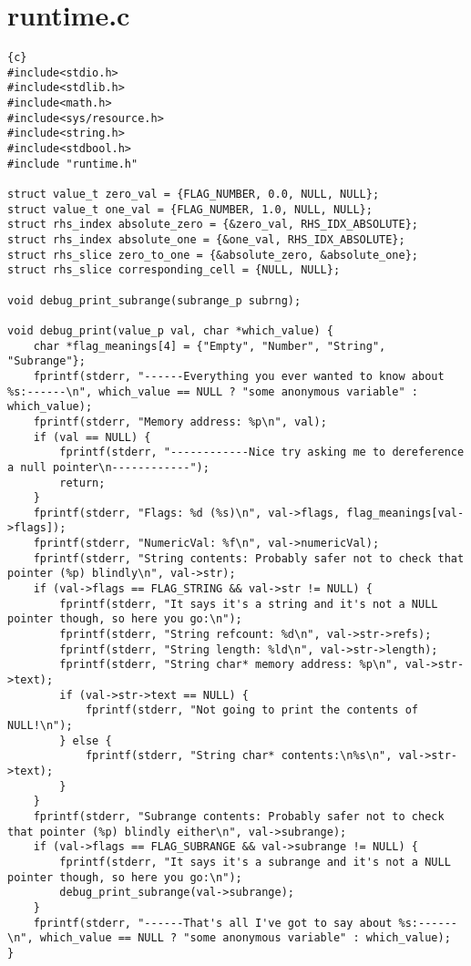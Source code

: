 \section{runtime.c}
\begin{lstlisting}{c}
#include<stdio.h>
#include<stdlib.h>
#include<math.h>
#include<sys/resource.h>
#include<string.h>
#include<stdbool.h>
#include "runtime.h"

struct value_t zero_val = {FLAG_NUMBER, 0.0, NULL, NULL};
struct value_t one_val = {FLAG_NUMBER, 1.0, NULL, NULL};
struct rhs_index absolute_zero = {&zero_val, RHS_IDX_ABSOLUTE};
struct rhs_index absolute_one = {&one_val, RHS_IDX_ABSOLUTE};
struct rhs_slice zero_to_one = {&absolute_zero, &absolute_one};
struct rhs_slice corresponding_cell = {NULL, NULL};

void debug_print_subrange(subrange_p subrng);

void debug_print(value_p val, char *which_value) {
	char *flag_meanings[4] = {"Empty", "Number", "String", "Subrange"};
	fprintf(stderr, "------Everything you ever wanted to know about %s:------\n", which_value == NULL ? "some anonymous variable" : which_value);
	fprintf(stderr, "Memory address: %p\n", val);
	if (val == NULL) {
		fprintf(stderr, "------------Nice try asking me to dereference a null pointer\n------------");
		return;
	}
	fprintf(stderr, "Flags: %d (%s)\n", val->flags, flag_meanings[val->flags]);
	fprintf(stderr, "NumericVal: %f\n", val->numericVal);
	fprintf(stderr, "String contents: Probably safer not to check that pointer (%p) blindly\n", val->str);
	if (val->flags == FLAG_STRING && val->str != NULL) {
		fprintf(stderr, "It says it's a string and it's not a NULL pointer though, so here you go:\n");
		fprintf(stderr, "String refcount: %d\n", val->str->refs);
		fprintf(stderr, "String length: %ld\n", val->str->length);
		fprintf(stderr, "String char* memory address: %p\n", val->str->text);
		if (val->str->text == NULL) {
			fprintf(stderr, "Not going to print the contents of NULL!\n");
		} else {
			fprintf(stderr, "String char* contents:\n%s\n", val->str->text);
		}
	}
	fprintf(stderr, "Subrange contents: Probably safer not to check that pointer (%p) blindly either\n", val->subrange);
	if (val->flags == FLAG_SUBRANGE && val->subrange != NULL) {
		fprintf(stderr, "It says it's a subrange and it's not a NULL pointer though, so here you go:\n");
		debug_print_subrange(val->subrange);
	}
	fprintf(stderr, "------That's all I've got to say about %s:------\n", which_value == NULL ? "some anonymous variable" : which_value);
}


\end{lstlisting}
